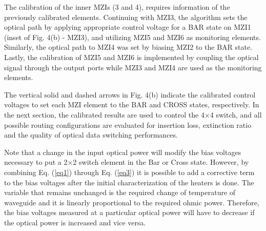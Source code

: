 The calibration of the inner MZIs (3 and 4), requires information of the previously calibrated elements. Continuing with MZI3, the algorithm sets the optical path by applying appropriate control voltage for a BAR state on MZI1 (inset of Fig. 4(b) - MZI3), and utilizing MZI5 and MZI6 as monitoring elements. Similarly, the optical path to MZI4 was set by biasing MZI2 to the BAR state. Lastly, the calibration of MZI5 and MZI6 is implemented by coupling the optical signal through the output ports while MZI3 and MZI4 are used as the monitoring elements.  




The vertical solid and dashed arrows in Fig. 4(b) indicate the calibrated control voltages to set each MZI element to the BAR and CROSS states, respectively. In the next section, the calibrated results are used to control the 4$\times$4 switch, and all possible routing configurations are evaluated for insertion loss, extinction ratio and the quality of optical data switching performances. 


Note that a change in the input optical power will modify the bias voltages necessary to put a 2$\times$2 switch element in the Bar or Cross state. However, by combining Eq. \mbox{(\ref{eq1})} through Eq. \mbox{(\ref{eq3})} it is possible to add a corrective term to the bias voltages after the initial characterization of the heaters is done. The variable that remains unchanged is the required change of temperature of waveguide and it is linearly proportional to the required ohmic power. Therefore, the bias voltages measured at a particular optical power will have to decrease if the optical power is increased and vice versa.



